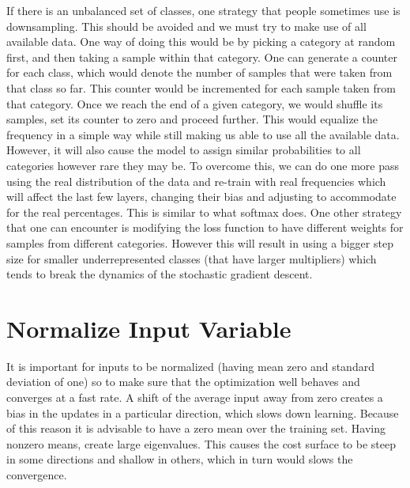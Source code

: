 If there is an unbalanced set of classes, one strategy that people sometimes use is downsampling. 
This should be avoided and we must try to make use of all available data. 
One way of doing this would be by picking a category at random first, and then taking a sample within that category. 
One can generate a counter for each class, which would denote the number of samples that were taken from that class so far. 
This counter would be incremented for each sample taken from that category. 
Once we reach the end of a given category, we would shuffle its samples, set its counter to zero and proceed further. 
This would equalize the frequency in a simple way while still making us able to use all the available data. 
However, it will also cause the model to assign similar probabilities to all categories however rare they may be.  
To overcome this, we can do one more pass using the real distribution of the data and re-train with real frequencies which will affect the last few layers, changing their bias and adjusting to accommodate for the real percentages. 
This is similar to what softmax does. One other strategy that one can encounter is modifying the loss function to have different weights for samples from different categories. 
However this will result in using a bigger step size for smaller underrepresented classes (that have larger multipliers) which tends to break the dynamics of the stochastic gradient descent.\\

{\centering{}\par}
\vspace{5pt}

\section{Normalize Input Variable} 
It is important for inputs to be normalized (having mean zero and standard deviation of one) so to make sure that the optimization well behaves and converges at a fast rate.
A shift of the average input away from zero creates a bias in the updates in a particular direction, which slows down learning. 
Because of this reason it is advisable to have a zero mean over the training set. 
Having nonzero means, create large eigenvalues. This causes the cost surface to be steep in some directions and shallow in others, which in turn would slows the convergence. \\


